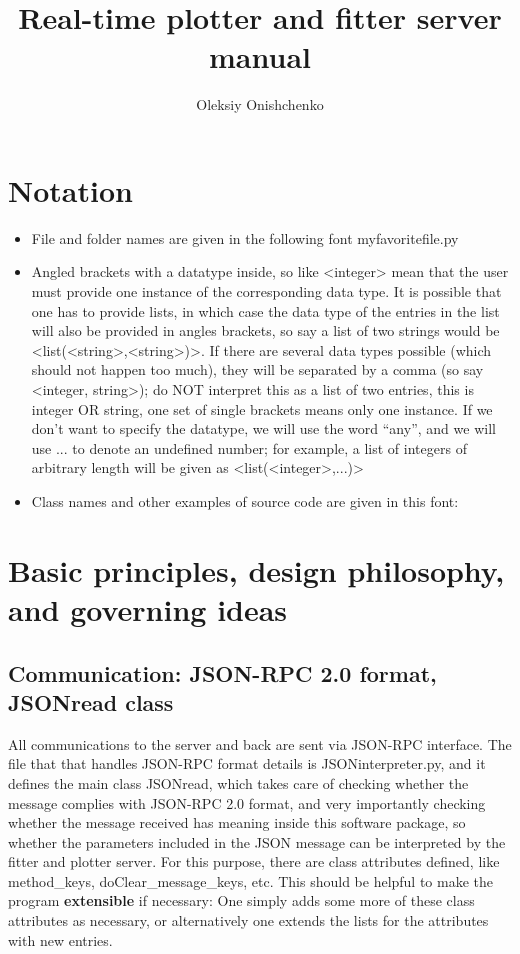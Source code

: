 \documentclass[11pt]{article} %
\title{Real-time plotter and fitter server manual}
\author{Oleksiy Onishchenko}
\begin{document}
\maketitle

\section{Notation}

\begin{itemize}
	\item File and folder names are given in the following font { myfavoritefile.py} 
	\item Angled brackets with a datatype inside, so like <integer> mean that the user must provide one instance of the corresponding data type. It is possible that one has to provide lists, in which case the data type of the entries in the list will also be provided in angles brackets, so say a list of two strings would be <list(<string>,<string>)>. If there are several data types possible (which should not happen too much), they will be separated by a comma (so say <integer, string>); do NOT interpret this as a list of two entries, this is integer OR string, one set of single brackets means only one instance. If we don't want to specify the datatype, we will use the word ``any'', and we will use ... to denote an undefined number; for example, a list of integers of arbitrary length will be given as <list(<integer>,...)>
	\item Class names and other examples of source code are given in { this font}: 
\end{itemize}

\section{Basic principles, design philosophy, and governing ideas} \label{basicprinciples}

\subsection{Communication: JSON-RPC 2.0 format, JSONread class}

All communications to the server and back are sent via JSON-RPC interface. The file that that handles JSON-RPC format details is { JSONinterpreter.py}, and it defines the main class { JSONread}, which takes care of checking whether the message complies with JSON-RPC 2.0 format, and very importantly checking whether the message received has meaning inside this software package, so whether the parameters included in the JSON message can be interpreted by the fitter and plotter server. For this purpose, there are class attributes defined, like { method\_keys, doClear\_message\_keys}, etc. This should be helpful to make the program \textbf{extensible} if necessary: One simply adds some more of these class attributes as necessary, or alternatively one extends the lists for the attributes with new entries.  
\end{document}
